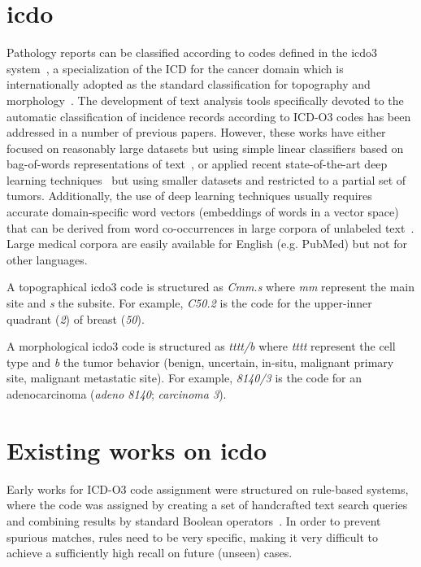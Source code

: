 \section{\ac{icdo}}
Pathology reports can be classified according
to codes defined in the \ac{icdo3}
system~\cite{fritz_international_2000}, a specialization of the ICD
for the cancer domain which is internationally adopted as the standard
classification for topography and
morphology~\cite{airtum_handbook_2008}.  The development of text
analysis tools specifically devoted to the automatic classification of
incidence records according to ICD-O3 codes has been addressed in a
number of previous papers. However, these
works have either focused on reasonably large datasets but
using simple linear classifiers based on bag-of-words representations
of text~\cite{jouhet_automated_2011,kavuluru_automatic_2013}, or
applied recent state-of-the-art deep learning
techniques~\cite{gao_hierarchical_2018,qiu_deep_2018} but using
smaller datasets and restricted to a partial set of
tumors. Additionally, the use of deep learning techniques usually
requires accurate domain-specific word vectors (embeddings of words in
a vector space) that can be derived from word co-occurrences in large
corpora of unlabeled
text~\cite{mikolov_linguistic_2013,pennington_glove:_2014,devlin2018bert}. Large
medical corpora are easily available for English (e.g. PubMed) but not
 for other languages.

A topographical \ac{icdo3} code is structured as \emph{Cmm.s} where
\emph{mm} represent the main site and \emph{s} the subsite. For example, \emph{C50.2}
is the code for the upper-inner quadrant (\emph{2}) of breast (\emph{50}).

A morphological \ac{icdo3} code is structured as \emph{tttt/b}
where \emph{tttt} represent the cell type and \emph{b} the tumor
behavior (benign, uncertain, in-situ, malignant primary site,
malignant metastatic site). For example, \emph{8140/3}
is the code for an adenocarcinoma (\emph{adeno 8140};
\emph{carcinoma 3}).

\section{Existing works on \ac{icdo}}
Early works for ICD-O3 code assignment were structured on rule-based
systems, where the code was assigned by creating a set of handcrafted
text search queries and combining results by standard Boolean
operators~\cite{crocetti_automatic_2004}. In order to prevent spurious
matches, rules need to be very specific, making it very difficult to
achieve a sufficiently high recall on future (unseen) cases.

